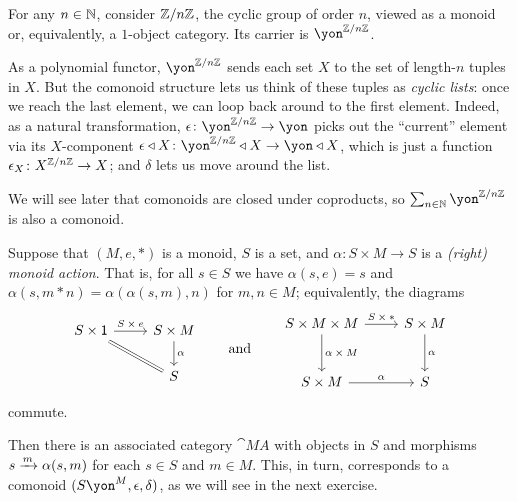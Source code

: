 \documentclass[Book-Poly]{subfiles}
\begin{document}
\begin{example}
For any $n\in\mathbb{N}$, consider $\mathbb{Z}/n\mathbb{Z}$, the cyclic group of order $n$, viewed as a monoid or, equivalently, a $1$-object category.
Its carrier is $\yon^{\zz/n\zz}$.

As a polynomial functor, $\yon^{\zz/n\zz}$ sends each set $X$ to the set of length-$n$ tuples in $X$.
But the comonoid structure lets us think of these tuples as \emph{cyclic lists}: once we reach the last element, we can loop back around to the first element.
Indeed, as a natural transformation, $\epsilon\colon\yon^{\zz/n\zz}\to\yon$ picks out the ``current'' element via its $X$-component $\epsilon\tri X\colon\yon^{\zz/n\zz}\tri X\to\yon\tri X$, which is just a function $\epsilon_X\colon X^{\mathbb{Z}/n\mathbb{Z}}\to X$; and $\delta$ lets us move around the list.%

We will see later that comonoids are closed under coproducts, so $\sum_{n\in\nn}\yon^{\zz/n\zz}$ is also a comonoid.
\end{example}

\begin{example}\label{ex.monoid_action}
Suppose that $(M,e,*)$ is a monoid, $S$ is a set, and $\alpha\colon S\times M\to S$ is a \emph{(right) monoid action}.
That is, for all $s\in S$ we have $\alpha(s,e)=s$ and $\alpha(s,m*n)=\alpha(\alpha(s,m),n)$ for $m,n\in M$; equivalently, the diagrams
\[
\begin{tikzcd}
	S\times\1\ar[rd,equals]\ar[r,"S\:\times\:e"] & S\times M\ar[d,"\alpha"]\\
	& S
\end{tikzcd}
\qqand
\begin{tikzcd}[row sep=large]
    S\times M\times M\ar[r,"S\:\times\:*"]\ar[d,"\alpha\:\times\:M"] & S\times M\ar[d,"\alpha"]\\
    S\times M\ar[r,"\alpha"] & S
\end{tikzcd}
\]
commute.

Then there is an associated category $\cat{M\!A}$ with objects in $S$ and morphisms $s\xrightarrow{m}\alpha(s,m)$ for each $s\in S$ and $m\in M$.
This, in turn, corresponds to a comonoid $(S\yon^M,\epsilon,\delta)$, as we will see in the next exercise.
\end{example}
\end{document}
